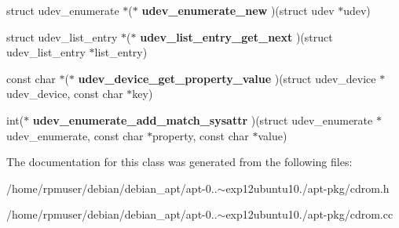 \begin{DoxyCompactItemize}
\item 
struct udev\-\_\-enumerate $\ast$($\ast$ {\bfseries udev\-\_\-enumerate\-\_\-new} )(struct udev $\ast$udev)\label{classpkgUdevCdromDevices_aff73c68f8683b9c1d4136a2c82d84105}

\item 
struct udev\-\_\-list\-\_\-entry $\ast$($\ast$ {\bfseries udev\-\_\-list\-\_\-entry\-\_\-get\-\_\-next} )(struct udev\-\_\-list\-\_\-entry $\ast$list\-\_\-entry)\label{classpkgUdevCdromDevices_a1162b93bffe87f21c9433d377f40e525}

\item 
const char $\ast$($\ast$ {\bfseries udev\-\_\-device\-\_\-get\-\_\-property\-\_\-value} )(struct udev\-\_\-device $\ast$udev\-\_\-device, const char $\ast$key)\label{classpkgUdevCdromDevices_a530c0819879a8bcca0a752da9608d91c}

\item 
int($\ast$ {\bfseries udev\-\_\-enumerate\-\_\-add\-\_\-match\-\_\-sysattr} )(struct udev\-\_\-enumerate $\ast$udev\-\_\-enumerate, const char $\ast$property, const char $\ast$value)\label{classpkgUdevCdromDevices_ace6968bb05ca644e040f16e82bca6edb}

\end{DoxyCompactItemize}


\-The documentation for this class was generated from the following files\-:\begin{DoxyCompactItemize}
\item 
/home/rpmuser/debian/debian\-\_\-apt/apt-\/0..$\sim$exp12ubuntu10./apt-\/pkg/cdrom.\-h\item 
/home/rpmuser/debian/debian\-\_\-apt/apt-\/0..$\sim$exp12ubuntu10./apt-\/pkg/cdrom.\-cc\end{DoxyCompactItemize}
